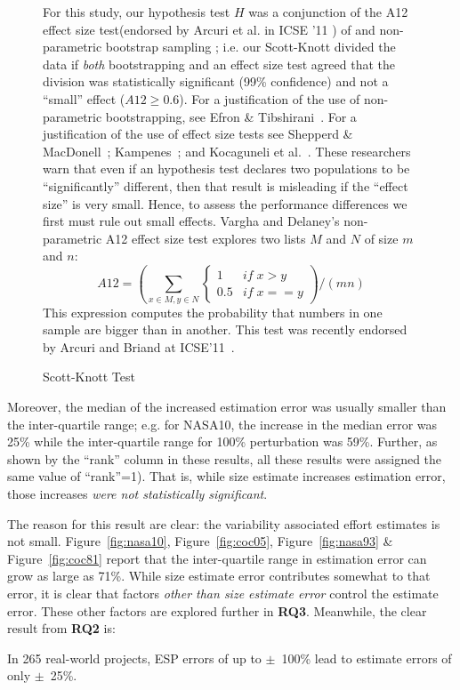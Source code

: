 \documentclass[final,twocolumn]{elsarticle}
\newcommand{\fig}[1]{Figure~\ref{fig:#1}}
\theoremstyle{break}
\begin{document}
\begin{figure}[!ht]
\begin{minipage}[c]{\linewidth}
\begin{mdframed}
    For this study, our hypothesis test $H$ was a conjunction of the A12 effect size test(endorsed by Arcuri et al. in ICSE '11 \cite{arcuri11}) of  and non-parametric bootstrap sampling \cite{efron93}; i.e. our Scott-Knott divided the data if {\em both}
    bootstrapping and an effect size test agreed that the division was statistically significant (99\% confidence) and not a ``small'' effect ($A12 \ge 0.6$). 
    For a justification of the use of non-parametric
    bootstrapping, see Efron \&
    Tibshirani~\cite[p220-223]{efron93}.
    For a justification of the use of effect size tests
    see Shepperd \& MacDonell~\cite{shepperd12a}; Kampenes~\cite{kampenes07}; and
    Kocaguneli et al.~\cite{kocharm13}. These researchers
    warn that even if an
    hypothesis test declares two populations to be
    ``significantly'' different, then that result is
    misleading if the ``effect size'' is very small.
    Hence, to assess 
    the performance differences 
    we first must rule out small effects.
    Vargha and Delaney's
    non-parametric 
    A12 effect size test 
    explores
    two lists $M$ and $N$ of size $m$ and $n$:
    \[A12 = \left(\sum_{x\in M, y \in N} 
    \begin{cases} 
    1   & \mathit{if}\; x > y\\
    0.5 & \mathit{if}\; x == y
    \end{cases}\right) / (mn)
    \]
    This expression computes the probability that numbers in one sample are bigger than in another.
    This test was recently 
    endorsed by Arcuri and Briand
    at ICSE'11~\cite{arcuri11}.
    \end{mdframed}
    \caption{Scott-Knott Test}
    \end{minipage}
    \label{fig:sk}
\end{figure}
Moreover, the median of the increased estimation error was usually smaller than
the inter-quartile range; e.g. for NASA10, the increase in the median error was
25\% while the inter-quartile range for 100\% perturbation was 59\%. Further, as
shown by the ``rank'' column in these results, all these results
were assigned the same value of ``rank''=1).
That is, while size estimate increases estimation error, those increases
{\em were not statistically significant}.

The reason for this result are clear: the variability associated effort estimates is not small.
\fig{nasa10}, \fig{coc05}, \fig{nasa93} \& \fig{coc81} report that the inter-quartile range in estimation error
can grow as large as 71\%. While size estimate error contributes somewhat to that error, it is clear
that  factors {\em other than size estimate error} control the estimate error.
These other factors are explored further in {\bf RQ3}. Meanwhile,
the clear result from {\bf RQ2} is:
\begin{lesson}
  In 265 real-world projects,
  ESP errors of up to $\pm$~100\% lead to estimate errors of only $\pm$~25\%.
\end{lesson}
\end{document}
